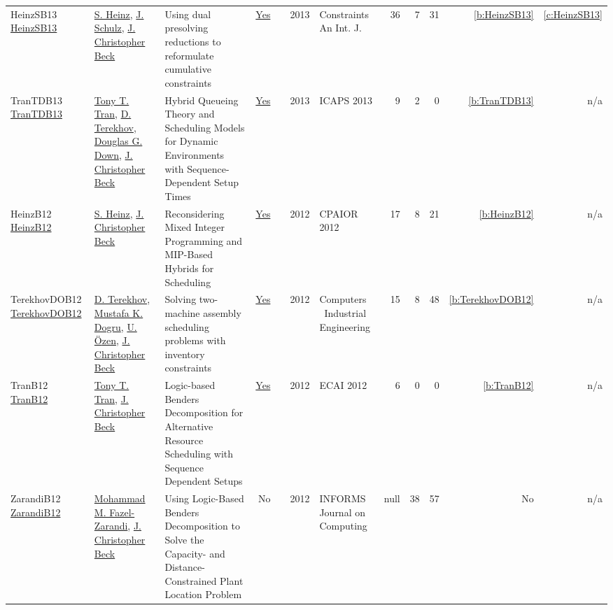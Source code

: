 {\begin{longtable}{>{\raggedright\arraybackslash}p{3cm}>{\raggedright\arraybackslash}p{6cm}>{\raggedright\arraybackslash}p{6.5cm}rrrp{2.5cm}rrrrr}
HeinzSB13 \href{https://doi.org/10.1007/s10601-012-9136-9}{HeinzSB13} & \hyperref[auth:a134]{S. Heinz}, \hyperref[auth:a135]{J. Schulz}, \hyperref[auth:a89]{J. Christopher Beck} & Using dual presolving reductions to reformulate cumulative constraints & \href{../works/HeinzSB13.pdf}{Yes} & \cite{HeinzSB13} & 2013 & Constraints An Int. J. & 36 & 7 & 31 & \ref{b:HeinzSB13} & \ref{c:HeinzSB13}\\
TranTDB13 \href{http://www.aaai.org/ocs/index.php/ICAPS/ICAPS13/paper/view/6005}{TranTDB13} & \hyperref[auth:a805]{Tony T. Tran}, \hyperref[auth:a824]{D. Terekhov}, \hyperref[auth:a809]{Douglas G. Down}, \hyperref[auth:a89]{J. Christopher Beck} & Hybrid Queueing Theory and Scheduling Models for Dynamic Environments with Sequence-Dependent Setup Times & \href{../works/TranTDB13.pdf}{Yes} & \cite{TranTDB13} & 2013 & ICAPS 2013 & 9 & 2 & 0 & \ref{b:TranTDB13} & n/a\\
HeinzB12 \href{https://doi.org/10.1007/978-3-642-29828-8_14}{HeinzB12} & \hyperref[auth:a134]{S. Heinz}, \hyperref[auth:a89]{J. Christopher Beck} & Reconsidering Mixed Integer Programming and MIP-Based Hybrids for Scheduling & \href{../works/HeinzB12.pdf}{Yes} & \cite{HeinzB12} & 2012 & CPAIOR 2012 & 17 & 8 & 21 & \ref{b:HeinzB12} & n/a\\
TerekhovDOB12 \href{https://doi.org/10.1016/j.cie.2012.02.006}{TerekhovDOB12} & \hyperref[auth:a824]{D. Terekhov}, \hyperref[auth:a826]{Mustafa K. Dogru}, \hyperref[auth:a827]{U. {\"{O}}zen}, \hyperref[auth:a89]{J. Christopher Beck} & Solving two-machine assembly scheduling problems with inventory constraints & \href{../works/TerekhovDOB12.pdf}{Yes} & \cite{TerekhovDOB12} & 2012 & Computers \  Industrial Engineering & 15 & 8 & 48 & \ref{b:TerekhovDOB12} & n/a\\
TranB12 \href{https://doi.org/10.3233/978-1-61499-098-7-774}{TranB12} & \hyperref[auth:a805]{Tony T. Tran}, \hyperref[auth:a89]{J. Christopher Beck} & Logic-based Benders Decomposition for Alternative Resource Scheduling with Sequence Dependent Setups & \href{../works/TranB12.pdf}{Yes} & \cite{TranB12} & 2012 & ECAI 2012 & 6 & 0 & 0 & \ref{b:TranB12} & n/a\\
ZarandiB12 \href{http://dx.doi.org/10.1287/ijoc.1110.0458}{ZarandiB12} & \hyperref[auth:a955]{Mohammad M. Fazel-Zarandi}, \hyperref[auth:a89]{J. Christopher Beck} & Using Logic-Based Benders Decomposition to Solve the Capacity- and Distance-Constrained Plant Location Problem & No & \cite{ZarandiB12} & 2012 & INFORMS Journal on Computing & null & 38 & 57 & No & n/a\\

\end{longtable}}
